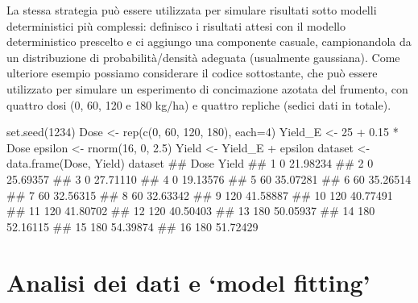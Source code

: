 \documentclass[a4paper,12pt,oneside]{book}
\newenvironment{Shaded}{\begin{snugshade}}{\end{snugshade}}
\newcommand{\DecValTok}[1]{#1}
\newcommand{\FloatTok}[1]{#1}
\newcommand{\SpecialCharTok}[1]{#1}
\newcommand{\DocumentationTok}[1]{#1}
\newcommand{\OtherTok}[1]{#1}
\newcommand{\FunctionTok}[1]{#1}
\newcommand{\AttributeTok}[1]{#1}
\newcommand{\NormalTok}[1]{#1}
\begin{document}
La stessa strategia può essere utilizzata per simulare risultati sotto modelli deterministici più complessi: definisco i risultati attesi con il modello deterministico prescelto e ci aggiungo una componente casuale, campionandola da un distribuzione di probabilità/densità adeguata (usualmente gaussiana). Come ulteriore esempio possiamo considerare il codice sottostante, che può essere utilizzato per simulare un esperimento di concimazione azotata del frumento, con quattro dosi (0, 60, 120 e 180 kg/ha) e quattro repliche (sedici dati in totale).

\begin{Shaded}
\begin{Highlighting}[]
\FunctionTok{set.seed}\NormalTok{(}\DecValTok{1234}\NormalTok{)}
\NormalTok{Dose }\OtherTok{\textless{}{-}} \FunctionTok{rep}\NormalTok{(}\FunctionTok{c}\NormalTok{(}\DecValTok{0}\NormalTok{, }\DecValTok{60}\NormalTok{, }\DecValTok{120}\NormalTok{, }\DecValTok{180}\NormalTok{), }\AttributeTok{each=}\DecValTok{4}\NormalTok{) }
\NormalTok{Yield\_E }\OtherTok{\textless{}{-}} \DecValTok{25} \SpecialCharTok{+} \FloatTok{0.15} \SpecialCharTok{*}\NormalTok{ Dose}
\NormalTok{epsilon }\OtherTok{\textless{}{-}} \FunctionTok{rnorm}\NormalTok{(}\DecValTok{16}\NormalTok{, }\DecValTok{0}\NormalTok{, }\FloatTok{2.5}\NormalTok{)}
\NormalTok{Yield }\OtherTok{\textless{}{-}}\NormalTok{ Yield\_E }\SpecialCharTok{+}\NormalTok{ epsilon}
\NormalTok{dataset }\OtherTok{\textless{}{-}} \FunctionTok{data.frame}\NormalTok{(Dose, Yield)}
\NormalTok{dataset}
\DocumentationTok{\#\#    Dose    Yield}
\DocumentationTok{\#\# 1     0 21.98234}
\DocumentationTok{\#\# 2     0 25.69357}
\DocumentationTok{\#\# 3     0 27.71110}
\DocumentationTok{\#\# 4     0 19.13576}
\DocumentationTok{\#\# 5    60 35.07281}
\DocumentationTok{\#\# 6    60 35.26514}
\DocumentationTok{\#\# 7    60 32.56315}
\DocumentationTok{\#\# 8    60 32.63342}
\DocumentationTok{\#\# 9   120 41.58887}
\DocumentationTok{\#\# 10  120 40.77491}
\DocumentationTok{\#\# 11  120 41.80702}
\DocumentationTok{\#\# 12  120 40.50403}
\DocumentationTok{\#\# 13  180 50.05937}
\DocumentationTok{\#\# 14  180 52.16115}
\DocumentationTok{\#\# 15  180 54.39874}
\DocumentationTok{\#\# 16  180 51.72429}
\end{Highlighting}
\end{Shaded}

\hypertarget{analisi-dei-dati-e-model-fitting}{%
\section{Analisi dei dati e `model fitting'}\label{analisi-dei-dati-e-model-fitting}}
\end{document}
